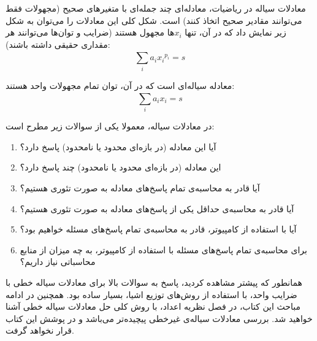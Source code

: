 \begin{extra}{معادلات سیاله}
    \p
    در ریاضیات،
    معادله‌ای چند جمله‌ای با متغیرهای صحیح
    (مجهولات فقط می‌توانند مقادیر صحیح اتخاذ کنند)
    است. شکل کلی این معادلات را می‌توان به شکل زیر نمایش داد
    که در آن، تنها ‌$x_i$ها مجهول هستند
    (ضرایب و توان‌ها می‌توانند هر مقداری حقیقی داشته باشند): 
    $$\sum\limits_{i}^{} {a_i} {x_i}^{p_i} = s$$

    \p
    معادله سیاله‌ای است که در آن، توان تمام مجهولات واحد هستند:
    $$\sum\limits_{i}^{} {a_i} {x_i} = s$$

    \p
        در معادلات سیاله، معمولا یکی از سوالات زیر مطرح است:
        \begin{enumerate}
            \item 
            آیا این معادله (در بازه‌ای محدود یا نامحدود) پاسخ دارد؟
            \item 
            این معادله (در بازه‌ای محدود یا نامحدود) چند پاسخ دارد؟
            \item 
            آیا قادر به محاسبه‌ی تمام پاسخ‌های معادله به صورت تئوری هستیم؟
            \item 
            آیا قادر به محاسبه‌ی حداقل یکی از پاسخ‌های معادله به صورت تئوری هستیم؟
            \item 
            آیا با استفاده از کامپیوتر، قادر به محاسبه‌ی تمام پاسخ‌های مسئله خواهیم بود؟
            \item 
            برای محاسبه‌ی تمام پاسخ‌های مسئله با استفاده از کامپیوتر، به چه میزان از منابع محاسباتی نیاز داریم؟
        \end{enumerate}

    \p
    همانطور که پیشتر مشاهده کردید، پاسخ به سوالات بالا برای معادلات سیاله خطی با ضرایب واحد، با استفاده از
    روش‌های توزیع اشیا، بسیار ساده بود.
    همچنین در ادامه مباحث این کتاب، در فصل نظریه اعداد، با روش کلی حل معادلات سیاله خطی
    آشنا خواهید شد.
    بررسی معادلات سیاله‌ی غیرخطی پیچیده‌تر می‌باشد و در پوشش این کتاب قرار نخواهد گرفت.
\end{extra}
